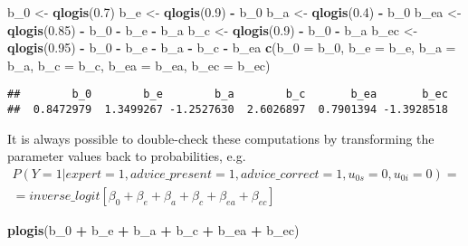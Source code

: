 \documentclass[
  man,floatsintext]{apa6}
\newenvironment{Shaded}{\begin{snugshade}}{\end{snugshade}}
\newcommand{\AttributeTok}[1]{\textcolor[rgb]{0.13,0.29,0.53}{#1}}
\newcommand{\FloatTok}[1]{\textcolor[rgb]{0.00,0.00,0.81}{#1}}
\newcommand{\FunctionTok}[1]{\textcolor[rgb]{0.13,0.29,0.53}{\textbf{#1}}}
\newcommand{\NormalTok}[1]{#1}
\newcommand{\OtherTok}[1]{\textcolor[rgb]{0.56,0.35,0.01}{#1}}
\newcommand{\SpecialCharTok}[1]{\textcolor[rgb]{0.81,0.36,0.00}{\textbf{#1}}}
\begin{document}
\begin{Shaded}
\begin{Highlighting}[]
\NormalTok{b\_0 }\OtherTok{\textless{}{-}} \FunctionTok{qlogis}\NormalTok{(}\FloatTok{0.7}\NormalTok{)}
\NormalTok{b\_e }\OtherTok{\textless{}{-}} \FunctionTok{qlogis}\NormalTok{(}\FloatTok{0.9}\NormalTok{) }\SpecialCharTok{{-}}\NormalTok{ b\_0}
\NormalTok{b\_a }\OtherTok{\textless{}{-}} \FunctionTok{qlogis}\NormalTok{(}\FloatTok{0.4}\NormalTok{) }\SpecialCharTok{{-}}\NormalTok{ b\_0}
\NormalTok{b\_ea }\OtherTok{\textless{}{-}} \FunctionTok{qlogis}\NormalTok{(}\FloatTok{0.85}\NormalTok{) }\SpecialCharTok{{-}}\NormalTok{ b\_0 }\SpecialCharTok{{-}}\NormalTok{ b\_e }\SpecialCharTok{{-}}\NormalTok{ b\_a}
\NormalTok{b\_c }\OtherTok{\textless{}{-}} \FunctionTok{qlogis}\NormalTok{(}\FloatTok{0.9}\NormalTok{) }\SpecialCharTok{{-}}\NormalTok{ b\_0 }\SpecialCharTok{{-}}\NormalTok{ b\_a}
\NormalTok{b\_ec }\OtherTok{\textless{}{-}} \FunctionTok{qlogis}\NormalTok{(}\FloatTok{0.95}\NormalTok{) }\SpecialCharTok{{-}}\NormalTok{ b\_0 }\SpecialCharTok{{-}}\NormalTok{ b\_e }\SpecialCharTok{{-}}\NormalTok{ b\_a }\SpecialCharTok{{-}}\NormalTok{ b\_c }\SpecialCharTok{{-}}\NormalTok{ b\_ea}
\FunctionTok{c}\NormalTok{(}\AttributeTok{b\_0 =}\NormalTok{ b\_0, }\AttributeTok{b\_e =}\NormalTok{ b\_e, }\AttributeTok{b\_a =}\NormalTok{ b\_a, }\AttributeTok{b\_c =}\NormalTok{ b\_c, }\AttributeTok{b\_ea =}\NormalTok{ b\_ea, }\AttributeTok{b\_ec =}\NormalTok{ b\_ec)}
\end{Highlighting}
\end{Shaded}

\begin{verbatim}
##        b_0        b_e        b_a        b_c       b_ea       b_ec 
##  0.8472979  1.3499267 -1.2527630  2.6026897  0.7901394 -1.3928518
\end{verbatim}

It is always possible to double-check these computations by transforming the parameter values back to probabilities, e.g.~
\[
\begin{aligned}
P(Y=1|expert = 1, advice\_present = 1, advice\_correct = 1, u_{0s} = 0, u_{0i} = 0) = \\
= inverse\_logit[\beta_0 + \beta_e + \beta_a + \beta_c + \beta_{ea} + \beta_{ec}]
\end{aligned}
\]

\begin{Shaded}
\begin{Highlighting}[]
\FunctionTok{plogis}\NormalTok{(b\_0 }\SpecialCharTok{+}\NormalTok{ b\_e }\SpecialCharTok{+}\NormalTok{ b\_a }\SpecialCharTok{+}\NormalTok{ b\_c }\SpecialCharTok{+}\NormalTok{ b\_ea }\SpecialCharTok{+}\NormalTok{ b\_ec)}
\end{Highlighting}
\end{Shaded}
\end{document}
